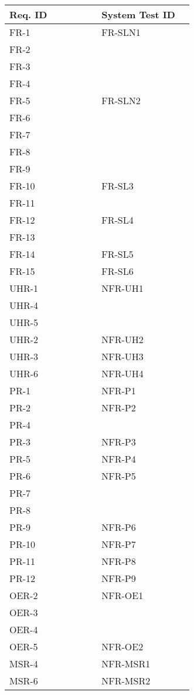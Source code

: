\documentclass[12pt, titlepage]{article}
\begin{document}
\begin{longtable}{|p{0.45\linewidth}|p{0.45\linewidth}|}
  \hline
  \textbf{Req. ID} & \textbf{System Test ID} \\
  \hline
  FR-1 & FR-SLN1\\
  FR-2 & \\
  FR-3 & \\
  FR-4 & \\
  \hline
  FR-5 & FR-SLN2\\
  FR-6 & \\
  FR-7 & \\
  FR-8 & \\
  FR-9 & \\
  \hline
  FR-10 & FR-SL3\\
  FR-11 & \\
  \hline
  FR-12 & FR-SL4\\
  FR-13 & \\
  \hline
  FR-14 & FR-SL5\\
  \hline
  FR-15 & FR-SL6\\
  \hline
  UHR-1 & NFR-UH1\\
  UHR-4 & \\
  UHR-5 & \\
  \hline
  UHR-2 & NFR-UH2\\
  \hline
  UHR-3 & NFR-UH3\\
  \hline
  UHR-6 & NFR-UH4\\
  \hline
  PR-1 & NFR-P1\\
  \hline
  PR-2 & NFR-P2\\
  PR-4 & \\
  \hline
  PR-3 & NFR-P3\\
  \hline
  PR-5 & NFR-P4\\
  \hline
  PR-6 & NFR-P5\\
  PR-7 & \\
  PR-8 & \\
  \hline
  PR-9 & NFR-P6\\
  \hline
  PR-10 & NFR-P7\\
  \hline
  PR-11 & NFR-P8\\
  \hline
  PR-12 & NFR-P9\\
  \hline
  OER-2 & NFR-OE1\\
  OER-3 & \\
  OER-4 & \\
  \hline
  OER-5 & NFR-OE2\\
  \hline
  MSR-4 & NFR-MSR1\\
  \hline
  MSR-6 & NFR-MSR2\\
  \hline

\end{longtable}
\end{document}
